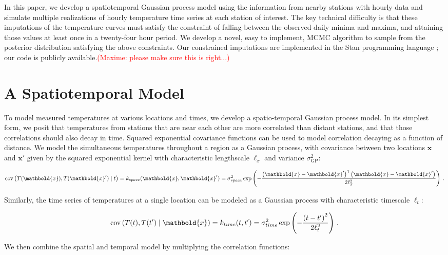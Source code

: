 \documentclass[letter]{article}
\newcommand \tcr[1]{\textcolor{red}{(#1)}}
\newcommand{\genericdel}[3]{%
      \left#1#3\right#2
    }
\newcommand{\del}[1]{\genericdel(){#1}}
\DeclareMathOperator{\cov}{{cov}}
\newcommand{\xvec}{\mathbold{x}}
\newcommand{\trans}{^{\intercal}}
\newcommand{\sigmaf}{\sigma_{\mathrm{GP}}}
\renewcommand{\cite}[1]{\citep{#1}}
\begin{document}
In this paper, we develop a spatiotemporal Gaussian process model using the information from nearby stations with hourly data and simulate multiple realizations of hourly temperature time series at each station of interest. The key technical difficulty is that these imputations of the temperature curves must satisfy the constraint of falling between the observed daily minima and maxima, and attaining those values at least once in a twenty-four hour period.
We develop a novel, easy to implement, MCMC algorithm to sample from the posterior distribution satisfying the above constraints. Our constrained imputations are implemented in the Stan programming language \cite{stancite}; our code is publicly available.\tcr{Maxime: please make sure this is right...}

\section{A Spatiotemporal Model}\label{a-spatiotemporal-model}

To model measured temperatures at various locations and times, we develop a spatio-temporal Gaussian process model.
In its simplest form, we posit that temperatures from stations that are near each other are more correlated than distant stations, and that those correlations should also decay in time.
Squared exponential covariance functions can be used to model correlation decaying as a function of distance.
We model the simultaneous temperatures throughout a region as a Gaussian process, with covariance between two locations \(\xvec\) and \(\xvec'\) given by the squared exponential kernel with characteristic lengthscale \(\ell_x\) and variance \(\sigmaf^2\):

\begin{equation}
    \cov\del{T(\xvec), T(\xvec') \mid t} = k_{space}(\xvec, \xvec') =  \sigma_{space}^2 \exp\del{-\frac{\del{\xvec-\xvec'}\trans\del{\xvec-\xvec'}}{2\ell_x^2}}\,.
    \label{eq:kspace}
\end{equation}

Similarly, the time series of temperatures at a single location can be modeled as a Gaussian process with characteristic timescale \(\ell_t\):

\begin{equation}
\cov\del{T(t), T(t') \mid \xvec} = k_{time}(t, t') = \sigma_{time}^2 \exp\del{-\frac{\del{t-t'}^2}{2\ell_t^2}}\,.
\end{equation}

We then combine the spatial and temporal model by multiplying the correlation functions:
\end{document}
